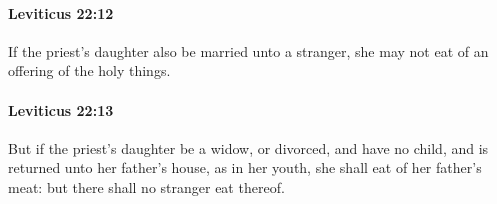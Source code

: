		\paragraph{Leviticus 22:12} %
			\label{LEVITICUS-22-12}

			If the priest’s daughter also be married unto a stranger, she may not eat of an offering of the holy things.


		\paragraph{Leviticus 22:13} %
			\label{LEVITICUS-22-13}

			But if the priest’s daughter be a widow, or divorced, and have no child, and is returned unto her father’s house, as in her youth, she shall eat of her father’s meat: but there shall no stranger eat thereof.


